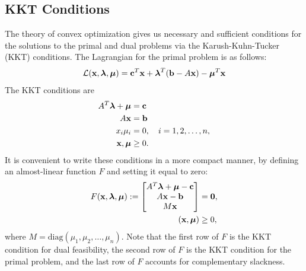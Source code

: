 \subsection*{KKT Conditions}

The theory of convex optimization gives us necessary and sufficient conditions for the solutions to the primal and dual problems via the Karush-Kuhn-Tucker (KKT) conditions.
The Lagrangian for the primal problem is as follows:
\[
\mathcal{L}(\mathbf{x}, \boldsymbol{\lambda}, \boldsymbol{\mu})
= \mathbf{c}^T\mathbf{x} + \boldsymbol{\lambda}^T(\mathbf{b} - A\mathbf{x}) - \boldsymbol{\mu}^T\mathbf{x}
\]
The KKT conditions are
\begin{align*}
A^T\boldsymbol{\lambda} + \boldsymbol{\mu} &= \mathbf{c}\\
A\mathbf{x} &= \mathbf{b}\\
x_i\mu_i &= 0, \quad i = 1,2,\ldots,n,\\
\mathbf{x}, \boldsymbol{\mu} &\geq 0.
\end{align*}
It is convenient to write these conditions in a more compact manner, by defining an almost-linear function $F$ and setting it equal to zero:
\begin{align*}
F(\mathbf{x},\boldsymbol{\lambda},\boldsymbol{\mu}) :=
\begin{bmatrix}
A^T\boldsymbol{\lambda} + \boldsymbol{\mu} - \mathbf{c}\\
A\mathbf{x} - \mathbf{b}\\
M\mathbf{x}\\
\end{bmatrix}
&= \mathbf{0},\\
(\mathbf{x},\boldsymbol{\mu}) &\geq 0,
\end{align*}
where $M = \text{diag}(\mu_1,\mu_2,\ldots,\mu_n)$.
Note that the first row of $F$ is the KKT condition for dual feasibility, the second row of $F$ is the KKT condition for the primal problem, and the last row of $F$ accounts for complementary slackness.

